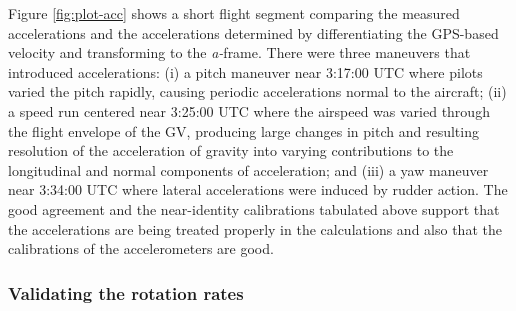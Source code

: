 \documentclass[12pt,twoside,english,12pt,twoside,english]{article}\usepackage[]{graphicx}\usepackage[]{color}
\let\OrgIndex\index
\renewcommand*{\index}[1]{\OrgIndex{#1}}
\begin{document}
Figure \ref{fig:plot-acc}
 shows a short flight segment comparing the measured accelerations
and the accelerations determined by differentiating the GPS-based
velocity and transforming to
the \emph{a-}frame.
There were three maneuvers that introduced accelerations:
(i) a pitch maneuver near 3:17:00 UTC where
pilots varied the pitch rapidly, causing periodic accelerations normal
to the aircraft; (ii) a speed run centered
near 3:25:00 UTC where the airspeed was varied through
the flight envelope of the GV, producing
large changes in pitch and resulting resolution of the acceleration
of gravity into varying contributions to the longitudinal
and normal components of acceleration; and (iii) a yaw maneuver
near 3:34:00 UTC where lateral accelerations
were induced by rudder action. The good agreement and the near-identity
calibrations tabulated above support that the accelerations are being
treated properly in the calculations and also that the calibrations
of the accelerometers are good.



\subsubsection{Validating the rotation rates\label{subsec:Checking-the-rotation}}
\end{document}
